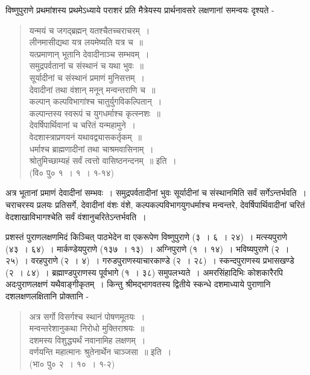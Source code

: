 {विष्णुपुराणे प्रथमांशस्य प्रथमेऽध्याये पराशरं प्रति मैत्रेयस्य प्रार्थनावसरे लक्षणानां समन्वयः दृश्यते -
\begin{verse}
यन्मयं च जगद्ब्रह्मन् यतश्चैतच्चराचरम्~। \\
लीनमासीद्यथा यत्र लयमेष्यति यत्र च~॥\\
यत्प्रमाणान् भूतानि देवादीनाञ्च सम्भवम्~। \\
समुद्रपर्वतानां च संस्थानं च यथा भुवः~॥\\
सूर्यादीनां च संस्थानं प्रमाणं मुनिसत्तम्~। \\
देवादीनां तथा वंशान् मनून् मन्वन्तराणि च~॥\\
कल्पान् कल्पविभागांश्च चातुर्युगविकल्पितान्~। \\
कल्पान्तस्य स्वरूपं च युगधर्माश्च कृत्स्नशः~॥\\
देवर्षिपार्थिवानां च चरितं यन्महामुने~। \\
वेदशास्त्राप्रणयनं यथावद्व्यासकर्तृकम्~॥\\
धर्माश्च ब्राह्मणादीनां तथा चाश्रमवासिनाम्~। \\
श्रोतुमिच्छाम्यहं सर्वं त्वत्तो वासिष्ठनन्दनम्~॥ इति~। \\
\hspace{5cm}(वि० पु० १~। १~। १-१४)
\end{verse}
अत्र भूतानां प्रमाणं देवादीनां सम्भवः~। समुद्रपर्वतादीनां भुवः सूर्यादीनां च संस्थानमिति सर्वं सर्गेऽन्तर्भवति~। चराचरस्य प्रलयः प्रतिसर्गे, देवादीनां वंशः वंशे, कल्पकल्पविभागयुगधर्माश्च मन्वन्तरे, देवर्षिपार्थिवादीनां चरितं वेदशाखाविभागश्चेति सर्वं वंशानुचरितेऽन्तर्भवति~। 

प्रशस्तं पुराणलक्षणमिदं किञ्चित् पाठभेदेन वा एकरूपेण विष्णुपुराणे (३~। ६~। २४)~। मत्स्यपुराणे (४३~। ६४)~। मार्कण्डेयपुराणे (१३७~। १३)~। अग्निपुराणे (१~। १४)~। भविष्यपुराणे (२~। २५)~। वरहपुराणे (२~। ४)~। गरुडपुराणस्याचारकाण्डे (२~। २८)~। स्कन्दपुराणस्य प्रभासखण्डे (२~। ८४)~। ब्रह्माण्डपुराणस्य पूर्वभागे (१~। ३८) समुपलभ्यते~। अमरसिंहादिभिः कोशकारैरपि अदःपुराणलक्षणं यथैवाङ्गीकृतम्~। किन्तु श्रीमद्भागवतस्य द्वितीये स्कन्धे दशमाध्याये पुराणानि दशलक्षणलक्षितानि प्रोक्तानि -
\begin{verse}
अत्र सर्गो विसर्गश्च स्थानं पोषणमूतयः~। \\
मन्वन्तरेशानुकथा निरोधो मुक्तिराश्रयः~॥\\
दशमस्य विशुद्ध्यर्थं नवानामिह लक्षणम्~। \\
वर्णयन्ति महात्मानः श्रुतेनार्थेन चाञ्जसा~॥ इति~।\\
\hspace{5cm}(भा० पु० २~। १०~। १-२)
\end{verse}

}
